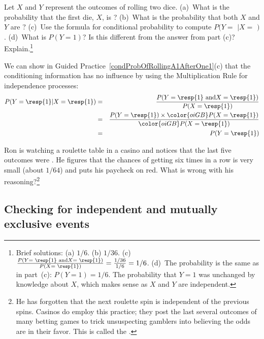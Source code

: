 \begin{exercise} \label{condProbOfRollingA1AfterOne1}
Let $X$ and $Y$ represent the outcomes of rolling two dice. (a)~What is the probability that the first die, $X$, is ? (b)~What is the probability that both $X$ and $Y$ are ? (c)~Use the formula for conditional probability to compute $P(Y =$  $| X = $ $)$. (d)~What is $P(Y=1)$? Is this different from the answer from part (c)? Explain.\footnote{Brief solutions: (a) $1/6$. (b) $1/36$. (c)~$\frac{P(Y = \text{ \resp{1} and}X=\text{ \resp{1}})}{P(X=\text{ \resp{1}})} = \frac{1/36}{1/6} = 1/6$. (d)~The probability is the same as in part~(c): $P(Y=1)=1/6$. The probability that $Y=1$ was unchanged by knowledge about $X$, which makes sense as $X$ and $Y$ are independent.}
\end{exercise}

We can show in Guided Practice~\ref{condProbOfRollingA1AfterOne1}(c) that the conditioning information has no influence by using the Multiplication Rule for independence processes:
\begin{eqnarray*}
P(Y=\text{\resp{1}}|X=\text{\resp{1}})
	&=& \frac{P(Y=\text{\resp{1} and}X=\text{\resp{1}})}{P(X=\text{\resp{1}})} \\
	&=& \frac{P(Y=\text{\resp{1}})\times \color{oiGB}P(X=\text{\resp{1}})}{\color{oiGB}P(X=\text{\resp{1}})} \\
	&=& P(Y=\text{\resp{1}}) \\
\end{eqnarray*}

\begin{exercise}
Ron is watching a roulette table in a casino and notices that the last five outcomes were . He figures that the chances of getting  six times in a row is very small (about $1/64$) and puts his paycheck on red. What is wrong with his reasoning?\footnote{He has forgotten that the next roulette spin is independent of the previous spins. Casinos do employ this practice; they post the last several outcomes of many betting games to trick unsuspecting gamblers into believing the odds are in their favor. This is called the .}
\end{exercise}


\subsection{Checking for independent and mutually exclusive events}

